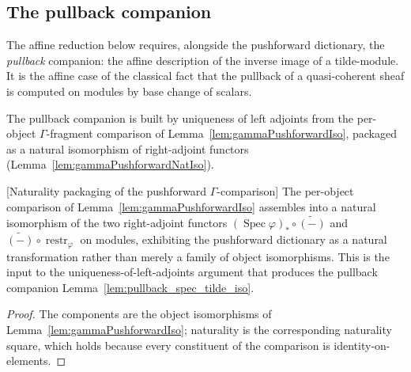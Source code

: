 \subsection{The pullback companion}

The affine reduction below requires, alongside the pushforward dictionary, the
\emph{pullback} companion: the affine description of the inverse image of a
tilde-module. It is the affine case of the classical fact that the pullback of a
quasi-coherent sheaf is computed on modules by base change of scalars.

The pullback companion is built by uniqueness of left adjoints from the
per-object \(\Gamma\)-fragment comparison of
Lemma~\ref{lem:gammaPushforwardIso}, packaged as a natural isomorphism of
right-adjoint functors (Lemma~\ref{lem:gammaPushforwardNatIso}).

\begin{lemma}


[Naturality packaging of the pushforward \(\Gamma\)-comparison]
  \label{lem:gammaPushforwardNatIso}
  The per-object comparison of Lemma~\ref{lem:gammaPushforwardIso} assembles into a
  natural isomorphism of the two right-adjoint functors
  \((\operatorname{Spec}\varphi)_* \circ \widetilde{(-)}\) and
  \(\widetilde{(-)} \circ \operatorname{restr}_\varphi\) on modules, exhibiting the
  pushforward dictionary as a natural transformation rather than merely a family of
  object isomorphisms. This is the input to the uniqueness-of-left-adjoints argument
  that produces the pullback companion Lemma~\ref{lem:pullback_spec_tilde_iso}.
\end{lemma}
\begin{proof}
  The components are the object isomorphisms of Lemma~\ref{lem:gammaPushforwardIso};
  naturality is the corresponding naturality square, which holds because every
  constituent of the comparison is identity-on-elements.
\end{proof}

